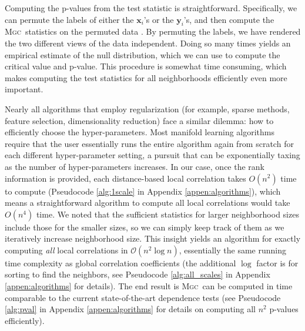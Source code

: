 \documentclass[11pt]{article}
\providecommand{\sct}[1]{{\normalfont\textsc{#1}}}
\providecommand{\mb}[1]{\boldsymbol{#1}}
\providecommand{\mc}[1]{\mathcal{#1}}
\newcommand{\Mgc}{\sct{Mgc}}
\newcommand{\mbx}{\ensuremath{\mb{x}}}
\newcommand{\mby}{\ensuremath{\mb{y}}}
\begin{document}
Computing the p-values from the test statistic is  straightforward.
Specifically, we can permute the labels of either the $\mbx_i$'s or the $\mby_i$'s, and then compute the \Mgc~statistics on the permuted data \cite{GoodPermutationBook}.  By permuting the labels, we have rendered the two different views of the data independent.  Doing so many times yields an empirical estimate of the null distribution, which we can use to compute the critical value and p-value. This procedure is somewhat time consuming, which makes computing the test statistics for all neighborhoods efficiently even more important.



Nearly all algorithms that employ regularization (for example, sparse methods, feature selection, dimensionality reduction) face a similar dilemma: how to efficiently choose the hyper-parameters.
% 
Most manifold learning algorithms require that the user essentially runs the entire algorithm again from scratch for each different hyper-parameter setting, a pursuit that can be exponentially taxing as the number of hyper-parameters increases.
In our case, once the rank information is provided, each distance-based local correlation takes $O(n^2)$ time to compute (Pseudocode \ref{alg:1scale} in Appendix \ref{appen:algorithms}), which means a straightforward algorithm to compute all local correlations would take $O(n^4)$ time.
% 
We noted that the sufficient statistics for larger neighborhood sizes include those for the smaller sizes, so we can simply keep track of them as we iteratively increase neighborhood size. 
This insight yields an algorithm for exactly computing \emph{all} local correlations in $\mc{O}(n^2 \log n)$, essentially the same running time complexity as  global correlation coefficients (the additional $\log$ factor is for sorting to find the neighbors, see Pseudocode \ref{alg:all_scales} in Appendix \ref{appen:algorithms} for details). The end result is \Mgc~can be computed in  time comparable to the current state-of-the-art dependence tests (see Pseudocode \ref{alg:pval} in Appendix \ref{appen:algorithms} for details on computing all $n^2$ p-values efficiently).
% 
\end{document}
